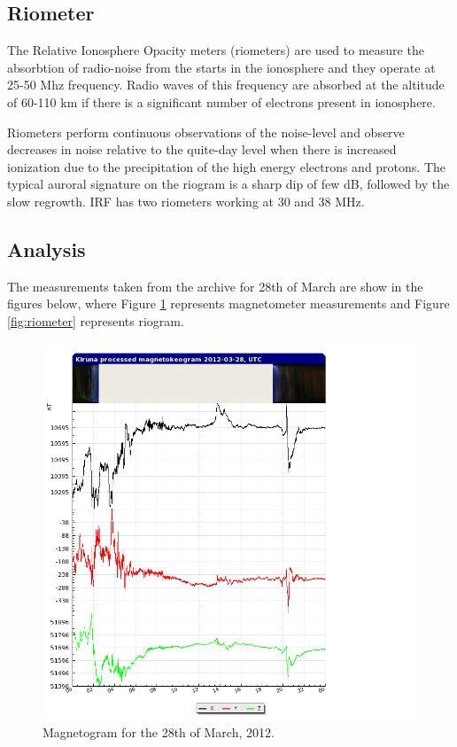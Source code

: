 \documentclass{article}
\begin{document}
\subsection{Riometer}
The Relative Ionosphere Opacity meters (riometers) are used to measure the absorbtion of radio-noise from the starts in the ionosphere and they operate at 25-50 Mhz frequency. Radio waves of this frequency are absorbed at the altitude of 60-110 km if there is a significant number of electrons present in ionosphere.

Riometers perform continuous observations of the noise-level and observe decreases in noise relative to the quite-day level when there is increased ionization due to the precipitation of the high energy electrons and protons. The typical auroral signature on the riogram is a sharp dip of few dB, followed by the slow regrowth. IRF has two riometers working at 30 and 38 MHz.

\subsection{Analysis}
The measurements taken from the archive for 28th of March are show in the figures below, where Figure \ref{fig:magnetometer} represents magnetometer measurements and Figure \ref{fig:riometer} represents riogram.

\begin{figure}[htbp!]
\centering
\includegraphics[width=1.3\textwidth]{Figures/magnetometer.png}
\caption{Magnetogram for the 28th of March, 2012.}
\label{fig:magnetometer}
\end{figure}
\end{document}
